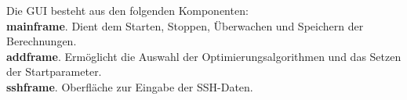 \begin{samepage}
Die GUI besteht aus den folgenden Komponenten: \\
\textbf{mainframe}. Dient dem Starten, Stoppen, Überwachen und Speichern der Berechnungen.\\
\textbf{addframe}. Ermöglicht die Auswahl der Optimierungsalgorithmen und das Setzen der Startparameter.\\
\textbf{sshframe}. Oberfläche zur Eingabe der SSH-Daten.
\end{samepage}
